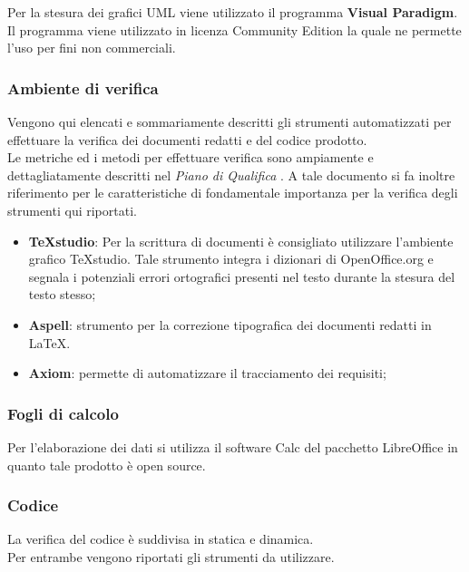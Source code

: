 Per la stesura dei grafici UML viene utilizzato il programma \textbf{Visual Paradigm}. Il programma viene utilizzato in licenza Community Edition la quale ne permette l’uso per fini non commerciali.



\subsubsection{Ambiente di verifica}

Vengono qui elencati e sommariamente descritti gli strumenti automatizzati per effettuare la verifica dei documenti redatti e del codice prodotto.\\ 
Le metriche ed i metodi per effettuare verifica sono ampiamente e dettagliatamente descritti nel \emph{Piano di Qualifica} . A tale documento si fa inoltre riferimento per le 
caratteristiche di fondamentale importanza per la verifica degli strumenti qui riportati. 

\begin{itemize}
\item \textbf{TeXstudio}: Per la scrittura di documenti \`{e} consigliato utilizzare l’ambiente grafico TeXstudio. Tale strumento integra i dizionari di OpenOffice.org e segnala i potenziali errori ortografici presenti nel 
testo durante la stesura del testo stesso; 
\item \textbf{Aspell}: strumento per la correzione tipografica dei documenti redatti in \LaTeX. 
\item \textbf{Axiom}: permette di automatizzare il tracciamento dei requisiti; 
\end{itemize} 


\subsubsection{Fogli di calcolo}
Per l’elaborazione dei dati si utilizza il software Calc del pacchetto LibreOffice in quanto
tale prodotto \`{e} open source.


\subsubsection{Codice} 

La verifica del codice \`{e} suddivisa in statica e dinamica.\\ 
Per entrambe vengono riportati gli strumenti da utilizzare. 


